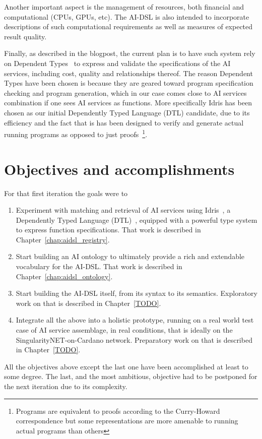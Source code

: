 \documentclass[]{report}
\begin{document}
Another important aspect is the management of resources, both
financial and computational (CPUs, GPUs, etc).  The AI-DSL is also
intended to incorporate descriptions of such computational
requirements as well as measures of expected result quality.

Finally, as described in the blogpost, the current plan is to have
such system rely on Dependent Types~\cite{Altenkirch05whydependent} to
express and validate the specifications of the AI services, including
cost, quality and relationships thereof.  The reason Dependent Types
have been chosen is because they are geared toward program
specification checking and program generation, which in our case comes
close to AI services combination if one sees AI services as functions.
More specifically Idris has been chosen as our initial Dependently
Typed Language (DTL) candidate, due to its efficiency and the fact
that is has been designed to verify and generate actual running
programs as opposed to just proofs~\footnote{Programs are equivalent
to proofs according to the Curry-Howard correspondence but some
representations are more amenable to running actual programs than
others}.

\section{Objectives and accomplishments}
For that first iteration the goals were to
\begin{enumerate}
\item Experiment with matching and retrieval of AI services using
  Idris~\cite{Idris}, a Dependently Typed Language (DTL)~\cite{DTL},
  equipped with a powerful type system to express function
  specifications.  That work is described in
  Chapter~\ref{chap:aidsl_registry}.
\item Start building an AI ontology to ultimately provide a rich and
  extendable vocabulary for the AI-DSL.  That work is described in
  Chapter~\ref{chap:aidsl_ontology}.
\item Start building the AI-DSL itself, from its syntax to its
  semantics.  Exploratory work on that is described in
  Chapter~\ref{TODO}.
\item Integrate all the above into a holistic prototype, running on a
  real world test case of AI service assemblage, in real conditions,
  that is ideally on the SingularityNET-on-Cardano network.
  Preparatory work on that is described in Chapter~\ref{TODO}.
\end{enumerate}
All the objectives above except the last one have been accomplished at
least to some degree.  The last, and the most ambitious, objective had
to be postponed for the next iteration due to its complexity.
\end{document}
